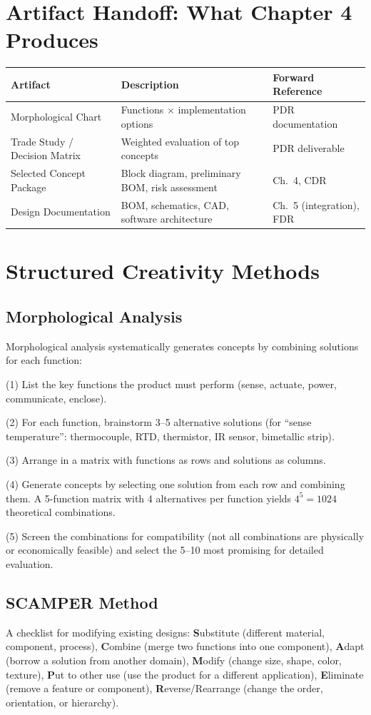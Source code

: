 \section{Artifact Handoff: What Chapter 4 Produces}
\begin{table}[htbp]\centering\small
\begin{tabularx}{\textwidth}{l X l}
\toprule
\textbf{Artifact} & \textbf{Description} & \textbf{Forward Reference} \\
\midrule
Morphological Chart & Functions $\times$ implementation options & PDR documentation \\
Trade Study / Decision Matrix & Weighted evaluation of top concepts & PDR deliverable \\
Selected Concept Package & Block diagram, preliminary BOM, risk assessment & Ch.~4, CDR \\
Design Documentation & BOM, schematics, CAD, software architecture & Ch.~5 (integration), FDR \\
\bottomrule
\end{tabularx}
\end{table}

\section{Structured Creativity Methods}
\subsection{Morphological Analysis}
Morphological analysis systematically generates concepts by combining solutions for each function:

(1) List the key functions the product must perform (sense, actuate, power, communicate, enclose).

(2) For each function, brainstorm 3--5 alternative solutions (for ``sense temperature'': thermocouple, RTD, thermistor, IR sensor, bimetallic strip).

(3) Arrange in a matrix with functions as rows and solutions as columns.

(4) Generate concepts by selecting one solution from each row and combining them. A 5-function matrix with 4 alternatives per function yields $4^5 = 1024$ theoretical combinations.

(5) Screen the combinations for compatibility (not all combinations are physically or economically feasible) and select the 5--10 most promising for detailed evaluation.

\subsection{SCAMPER Method}
A checklist for modifying existing designs: \textbf{S}ubstitute (different material, component, process), \textbf{C}ombine (merge two functions into one component), \textbf{A}dapt (borrow a solution from another domain), \textbf{M}odify (change size, shape, color, texture), \textbf{P}ut to other use (use the product for a different application), \textbf{E}liminate (remove a feature or component), \textbf{R}everse/Rearrange (change the order, orientation, or hierarchy).

